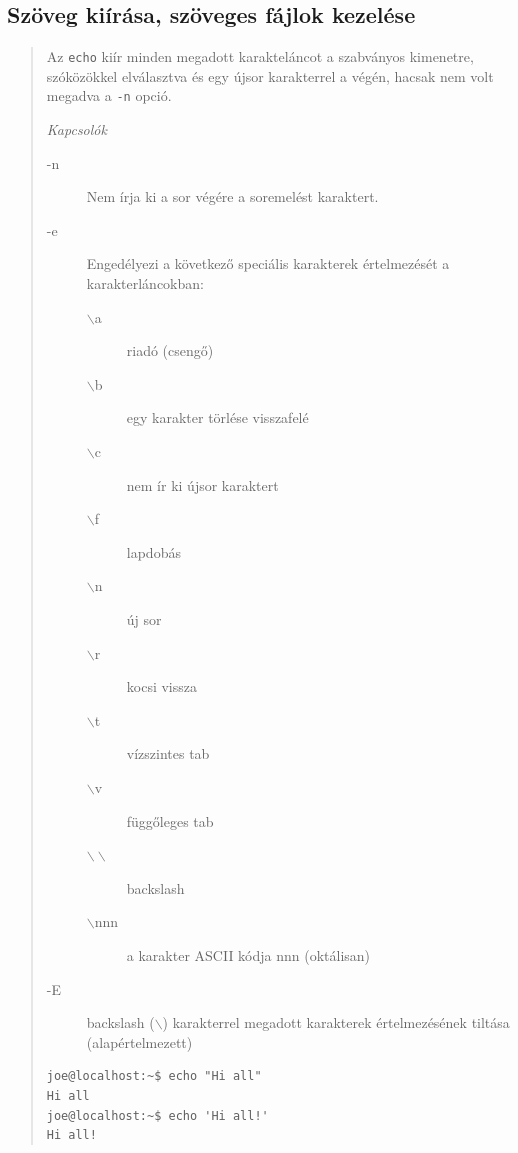\subsection{Szöveg kiírása, szöveges fájlok kezelése}
	\begin{quotation}
  Az   \verb.echo.  kiír  minden  megadott  karakteláncot a szabványos kimenetre,
       szóközökkel elválasztva és egy újsor karakterrel a  végén,  hacsak  nem
       volt megadva a \verb.-n. opció.
\bigskip

\emph{Kapcsolók}
\begin{description}

\item[-n]   Nem írja ki a sor végére a soremelést karaktert.


\item[-e]    Engedélyezi  a  következő  speciális  karakterek  értelmezését a
              karakterláncokban:
              \begin{description}
              \item[$\backslash$a]     riadó (csengő)
              \item[$\backslash$b]     egy karakter törlése visszafelé
              \item[$\backslash$c]     nem ír ki újsor karaktert
              \item[$\backslash$f]     lapdobás
              \item[$\backslash$n]     új sor
              \item[$\backslash$r]     kocsi vissza
              \item[$\backslash$t]     vízszintes tab
              \item[$\backslash$v]     függőleges tab
              \item[$\backslash\backslash$]     backslash
              \item[$\backslash$nnn]   a karakter ASCII kódja nnn (oktálisan)
              \end{description}

\item[-E]    backslash ($\backslash$) karakterrel megadott karakterek értelmezésének tiltása (alapértelmezett)
\end{description}

\begin{lstlisting}
joe@localhost:~$ echo "Hi all"
Hi all
joe@localhost:~$ echo 'Hi all!'
Hi all!
\end{lstlisting}

\end{quotation}

